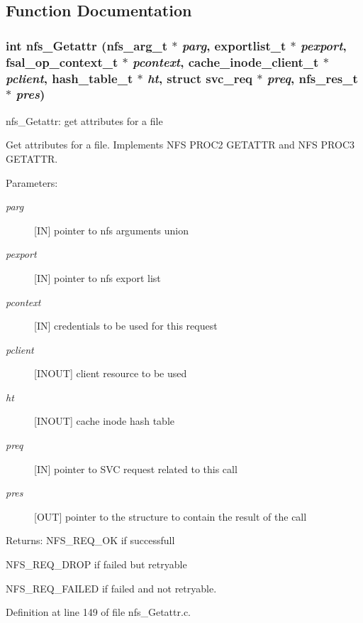 \subsection{Function Documentation}
\subsubsection{\setlength{\rightskip}{0pt plus 5cm}int nfs\_\-Getattr (nfs\_\-arg\_\-t $\ast$ {\em parg}, exportlist\_\-t $\ast$ {\em pexport}, fsal\_\-op\_\-context\_\-t $\ast$ {\em pcontext}, cache\_\-inode\_\-client\_\-t $\ast$ {\em pclient}, hash\_\-table\_\-t $\ast$ {\em ht}, struct svc\_\-req $\ast$ {\em preq}, nfs\_\-res\_\-t $\ast$ {\em pres})}\label{nfs__Getattr_8c_a0}


nfs\_\-Getattr: get attributes for a file

Get attributes for a file. Implements NFS PROC2 GETATTR and NFS PROC3 GETATTR.

\begin{Desc}
\item[Parameters:]
\begin{description}
\item[{\em parg}][IN] pointer to nfs arguments union \item[{\em pexport}][IN] pointer to nfs export list \item[{\em pcontext}][IN] credentials to be used for this request \item[{\em pclient}][INOUT] client resource to be used \item[{\em ht}][INOUT] cache inode hash table \item[{\em preq}][IN] pointer to SVC request related to this call \item[{\em pres}][OUT] pointer to the structure to contain the result of the call\end{description}
\end{Desc}
\begin{Desc}
\item[Returns:]NFS\_\-REQ\_\-OK if successfull \par
 NFS\_\-REQ\_\-DROP if failed but retryable \par
 NFS\_\-REQ\_\-FAILED if failed and not retryable. \end{Desc}


Definition at line 149 of file nfs\_\-Getattr.c.

